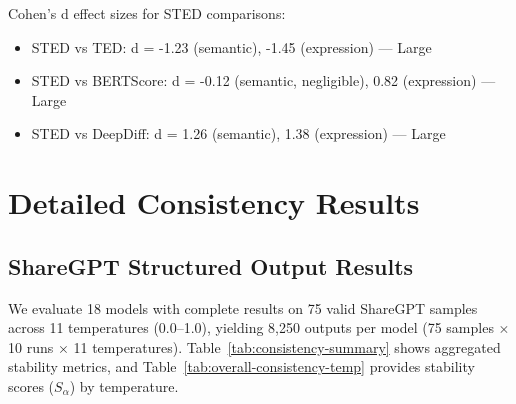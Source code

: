 \documentclass{article}
\theoremstyle{plain}
\theoremstyle{definition}
\begin{document}
Cohen's d effect sizes for STED comparisons:
\begin{itemize}
\item STED vs TED: d = -1.23 (semantic), -1.45 (expression) --- Large
\item STED vs BERTScore: d = -0.12 (semantic, negligible), 0.82 (expression) --- Large
\item STED vs DeepDiff: d = 1.26 (semantic), 1.38 (expression) --- Large
\end{itemize}

\section{Detailed Consistency Results}
\label{sec:results}

\subsection{ShareGPT Structured Output Results}
\label{sec:sharegpt-results}

We evaluate 18 models with complete results on 75 valid ShareGPT samples across 11 temperatures (0.0--1.0), yielding 8,250 outputs per model (75 samples $\times$ 10 runs $\times$ 11 temperatures). Table~\ref{tab:consistency-summary} shows aggregated stability metrics, and Table~\ref{tab:overall-consistency-temp} provides stability scores ($S_\alpha$) by temperature.
\end{document}
